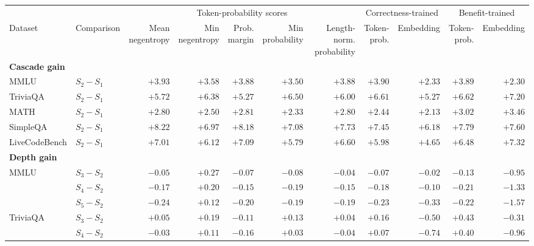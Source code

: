 \begin{tabular}{llrrrrrrrrr}
\toprule
 & & \multicolumn{5}{c}{Token-probability scores}
   & \multicolumn{2}{c}{Correctness-trained}
   & \multicolumn{2}{c}{Benefit-trained} \\
\cmidrule(lr){3-7}\cmidrule(lr){8-9}\cmidrule(lr){10-11}
Dataset & Comparison
 & \shortstack{Mean\\negentropy} & \shortstack{Min\\negentropy}
 & \shortstack{Prob.\\margin} & \shortstack{Min\\probability}
 & \shortstack{Length-norm.\\probability}
 & \shortstack{Token-\\prob.} & Embedding
 & \shortstack{Token-\\prob.} & Embedding \\
\midrule
\multicolumn{11}{l}{\textbf{Cascade gain}} \\
MMLU & $S_2-S_1$ & $+3.93$ & $+3.58$ & $+3.88$ & $+3.50$ & $+3.88$ & $+3.90$ & $+2.33$ & $+3.89$ & $+2.30$ \\
TriviaQA & $S_2-S_1$ & $+5.72$ & $+6.38$ & $+5.27$ & $+6.50$ & $+6.00$ & $+6.61$ & $+5.27$ & $+6.62$ & $+7.20$ \\
MATH & $S_2-S_1$ & $+2.80$ & $+2.50$ & $+2.81$ & $+2.33$ & $+2.80$ & $+2.44$ & $+2.13$ & $+3.02$ & $+3.46$ \\
SimpleQA & $S_2-S_1$ & $+8.22$ & $+6.97$ & $+8.18$ & $+7.08$ & $+7.73$ & $+7.45$ & $+6.18$ & $+7.79$ & $+7.60$ \\
LiveCodeBench & $S_2-S_1$ & $+7.01$ & $+6.12$ & $+7.09$ & $+5.79$ & $+6.60$ & $+5.98$ & $+4.65$ & $+6.48$ & $+7.32$ \\
\midrule
\multicolumn{11}{l}{\textbf{Depth gain}} \\
MMLU & $S_3-S_2$ & $-0.05$ & $+0.27$ & $-0.07$ & $-0.08$ & $-0.04$ & $-0.07$ & $-0.02$ & $-0.13$ & $-0.95$ \\
 & $S_4-S_2$ & $-0.17$ & $+0.20$ & $-0.15$ & $-0.19$ & $-0.15$ & $-0.18$ & $-0.10$ & $-0.21$ & $-1.33$ \\
 & $S_5-S_2$ & $-0.24$ & $+0.12$ & $-0.20$ & $-0.19$ & $-0.19$ & $-0.23$ & $-0.33$ & $-0.22$ & $-1.57$ \\
\addlinespace[3pt]
TriviaQA & $S_3-S_2$ & $+0.05$ & $+0.19$ & $-0.11$ & $+0.13$ & $+0.04$ & $+0.16$ & $-0.50$ & $+0.43$ & $-0.31$ \\
 & $S_4-S_2$ & $-0.03$ & $+0.11$ & $-0.16$ & $+0.03$ & $-0.04$ & $+0.07$ & $-0.74$ & $+0.40$ & $-0.96$ \\

\end{tabular}
